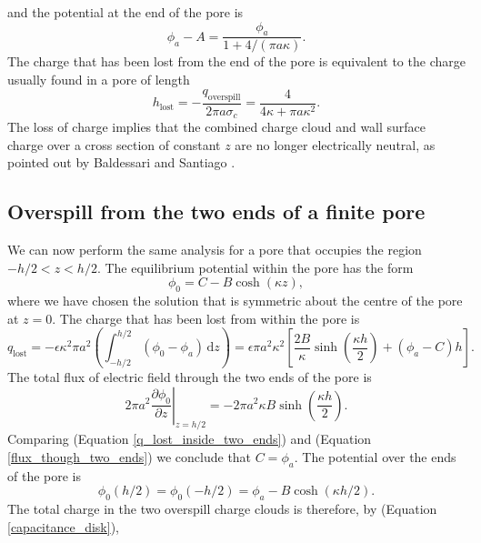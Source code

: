 and the potential at the end of the pore is
\begin{equation}
\phi_a-A=\frac{\phi_a}{1+4/(\pi a\kappa)}.
\end{equation}
The charge that has been lost from the end of the
pore is equivalent to the charge usually found in a pore of length
\begin{equation}
h_\text{lost}=-\frac{q_\text{overspill}}{2\pi a\sigma_c}
=\frac{4}{4\kappa+\pi a\kappa^2}.
\label{h_lost_one_end}
\end{equation}
The loss of charge implies that the combined charge cloud and wall
surface charge
over a cross section of constant $z$ are no longer electrically neutral,
as pointed out by Baldessari and Santiago \cite{baldessari2008a, baldessari2009a}.

\subsection{Overspill from the two ends of a finite pore}
We can now perform the same analysis for a pore that
occupies the region $-h/2<z<h/2$. The equilibrium
potential within the pore has the form
\begin{equation}
\phi_0=C-B\cosh(\kappa z),
\label{phi0_inside_two_ends}
\end{equation}
where we have chosen the solution that is symmetric about the centre of
the pore at $z=0$. The charge that has been lost from within the
pore is
\begin{equation}
q_\text{lost}=-\epsilon\kappa^2\pi a^2
\left(\int_{-h/2}^{h/2}(\phi_0-\phi_a)\,\text{d}z\right)
=\epsilon\pi a^2\kappa^2\left\lbrack
\frac{2B}{\kappa}\sinh\left(\frac{\kappa h}{2}\right)+(\phi_a-C)h\right\rbrack.
\label{q_lost_inside_two_ends}
\end{equation}
The total flux of electric field through the two ends of the pore
is
\begin{equation}
2\pi a^2\left.\frac{\partial\phi_0}{\partial z}\right|_{z=h/2}
=-2\pi a^2\kappa B\sinh\left(\frac{\kappa h}{2}\right).
\label{flux_though_two_ends}
\end{equation}
Comparing (Equation \ref{q_lost_inside_two_ends}) and
(Equation \ref{flux_though_two_ends}) we conclude that $C=\phi_a$. The potential
over the ends of the pore is
\begin{equation}
\phi_0(h/2)=\phi_0(-h/2)=\phi_a-B\cosh(\kappa h/2).
\end{equation}
The total charge in the two overspill charge clouds is therefore,
by (Equation \ref{capacitance_disk}),
